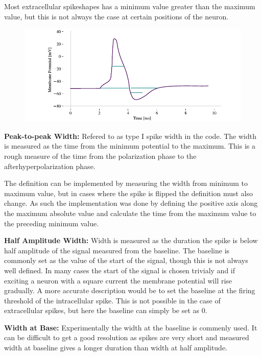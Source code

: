 \documentclass[altfont, fleqn]{uiophd}
\begin{document}
Most extracellular spikeshapes has a minimum value greater than the maximum 
value,
but this is not always the case at certain positions of the neuron. 
\\
\begin{figure}[h]
    \centering
    \includegraphics[width=\textwidth]{images/sec_3/action_potential_widths.pdf}
    \caption{}
    \label{fig:2_1_neuron}
\end{figure}

\noindent 
{\bf Peak-to-peak Width:} 
Refered to as type I spike width in the code. 
The width is measured as the time from the minimum potential to the maximum. 
This is a rough measure of the time from the polarization phase to 
the afterhyperpolarization phase. 

The definition can be implemented by measuring the width from
minimum to maximum value, but in cases where the spike is flipped
the definition must also change. 
As such the implementation was done by defining the positive axis along 
the maximum absolute value and calculate the time from 
the maximum value to the preceding minimum value.
\newline


\noindent 
{\bf Half Amplitude Width:} 
Width is measured as the duration the spike is below half amplitude of the 
signal measured from the baseline.
The baseline is commonly set as the value of the start of the signal, 
though this is not always well defined. 
In many cases the start of the signal is chosen trivialy
and if exciting a neuron with a square current the membrane potential will 
rise gradually. 
A more accurate description would be to set the baseline at the firing 
threshold of 
the intracellular spike. 
This is not possible in the case of extracellular spikes,
but here the baseline can simply be set as 0. 
\newline

\noindent 
{\bf Width at Base:} 
Experimentally the width at the baseline is commenly used.
It can be difficult to get a good resolution as spikes are very short
and measured width at baseline gives a longer duration than width at half 
amplitude. 
\end{document}
